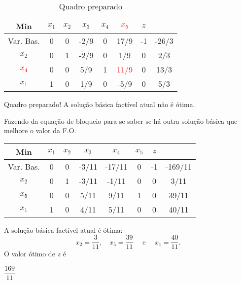 \begin{table}[!h]
\centering
\caption{Quadro preparado}
\begin{tabular}{|c|cccccc|c|}
  \hline
  Min                    & $x_1$ & $x_2$ & $x_3$ & $x_4$ & \textcolor{red}{$x_5$} & $z$  &       \\
  \hline
  Var. Bas.              &  0    &   0   &  -2/9 &   0   &  17/9                  &  -1  & -26/3 \\
  \hline
  $x_2$                  &  0    &   1   &  -2/9 &   0   &   1/9                  &   0  &   2/3 \\
  \textcolor{red}{$x_4$} &  0    &   0   &   5/9 &   1   &  \textcolor{red}{11/9} &   0  &  13/3 \\
  $x_1$                  &  1    &   0   &   1/9 &   0   &                   -5/9 &   0  &   5/3 \\
  \hline
\end{tabular}
\end{table}



Quadro preparado!
A solução básica factível atual não é ótima.

Fazendo da equação de bloqueio para se saber se há outra solução básica que
melhore o valor da F.O.

\begin{table}[!h]
\centering
\begin{tabular}{|c|cccccc|c|}
  \hline
  Min         & $x_1$ & $x_2$ & $x_3$ & $x_4$    & $x_5$ & $z$  &         \\
  \hline
  Var. Bas.   &  0    &   0   & -3/11 & -17/11   &     0 &  -1  & -169/11 \\
  \hline
  $x_2$       &  0    &   1   & -3/11 &  -1/11   &     0 &   0  &    3/11 \\
  $x_5$       &  0    &   0   &  5/11 &   9/11   &     1 &   0  &   39/11 \\
  $x_1$       &  1    &   0   &  4/11 &   5/11   &     0 &   0  &   40/11 \\
  \hline
\end{tabular}
\end{table}

A solução básica factível atual é ótima: 
\[ 
  x_2 = \frac{3}{11} ,  \quad x_5 = \frac{39}{11} \quad \text{ e } \quad x_1 = \frac{40}{11} .
\]
O valor ótimo de $ z $ é 

\begin{center}
  \shadowbox
  {
    $ \dfrac{169}{11} $
  }	
\end{center}
